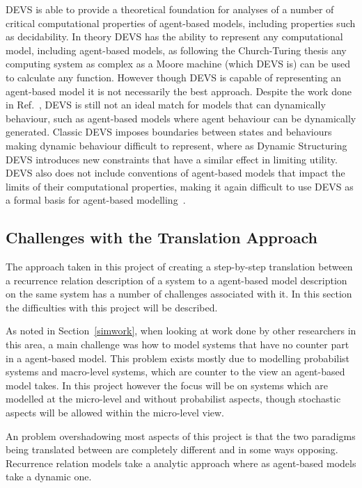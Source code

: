 \documentclass{article}
\begin{document}
DEVS is able to provide a theoretical foundation for analyses of a number of critical computational properties of agent-based models, including properties such as decidability. In theory DEVS has the ability to represent any computational model, including agent-based models, as following the Church-Turing thesis any computing system as complex as a Moore machine (which DEVS is) can be used to calculate any function. However though DEVS is capable of representing an agent-based model it is not necessarily the best approach. Despite the work done in Ref.~\cite{dynamicdevs}, DEVS is still not an ideal match for models that can dynamically behaviour, such as agent-based models where agent behaviour can be dynamically generated. Classic DEVS imposes boundaries between states and behaviours making dynamic behaviour difficult to represent, where as Dynamic Structuring DEVS introduces new constraints that have a similar effect in limiting utility. DEVS also does not include conventions of agent-based models that impact the limits of their computational properties, making it again difficult to use DEVS as a formal basis for agent-based modelling~\cite{taabm}.  






\subsection{Challenges with the Translation Approach} \label{twoviewsapproach} 
The approach taken in this project of creating a step-by-step translation between a recurrence relation description of a system to a agent-based model description on the same system has a number of challenges associated with it. In this section the difficulties with this project will be described. 

As noted in Section~\ref{simwork}, when looking at work done by other researchers in this area, a main challenge was how to model systems that have no counter part in a agent-based model. This problem exists mostly due to modelling probabilist systems and macro-level systems, which are counter to the view an agent-based model takes. In this project however the focus will be on systems which are modelled at the micro-level and without probabilist aspects, though stochastic aspects will be allowed within the micro-level view.

An problem overshadowing most aspects of this project is  that the two paradigms being translated between are completely different and in some ways opposing. Recurrence relation models take a analytic approach where as agent-based models take a dynamic one.   
\end{document}

